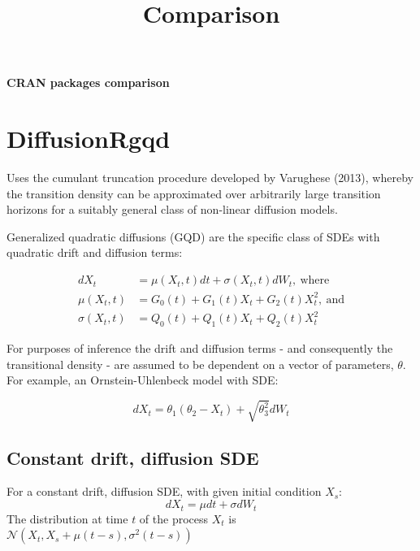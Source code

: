 \documentclass[a4paper,11pt]{article}
\begin{document}
\pagestyle{empty}
\title{Comparison}
\begin{center}
\Large\textbf{CRAN packages comparison} \\[11pt]
\normalsize
\end{center}

\section{DiffusionRgqd}
Uses the cumulant truncation procedure developed by Varughese (2013), whereby the transition density can be approximated over arbitrarily large transition horizons for a suitably general class of non-linear diffusion models.

Generalized quadratic diffusions (GQD) are the specific class of SDEs with quadratic drift and diffusion terms:

\begin{align*}
d X_t & = \mu(X_t, t)dt + \sigma(X_t, t)dW_t, \: \text{where} \\
\mu(X_t, t) & = G_0(t) + G_1(t) X_t + G_2(t) X_t^2, \: \text{and} \\
\sigma (X_t, t) & = Q_0(t) + Q_1(t) X_t + Q_2(t) X_t^2
\end{align*}

For purposes of inference the drift and diffusion terms - and consequently the transitional density - are assumed to be dependent on a vector of parameters, $\theta$. For example, an Ornstein-Uhlenbeck model with SDE:

\begin{equation}
d X_t = \theta_1 (\theta_2 - X_t) + \sqrt{\theta_3^2} dW_t
\end{equation}

\begin{knitrout}
\color{fgcolor}\begin{kframe}
\begin{alltt}
\hlkwb{=}\hlstd{(}\hlstd{)\{theta[}\hlstd{]}\hlopt{*}\hlstd{theta[}\hlstd{]\}}
\hlkwb{=}\hlstd{(}\hlstd{)\{}\hlopt{-}\hlstd{theta[}\hlstd{]\}}
\hlkwb{=}\hlstd{(}\hlstd{)\{theta[}\hlstd{]}\hlopt{*}\hlstd{theta[}\hlstd{]\}}
\end{alltt}
\end{kframe}
\end{knitrout}

\subsection{Constant drift, diffusion SDE}
For a constant drift, diffusion SDE, with given initial condition $X_s$:
\begin{equation}
dX_t = \mu dt + \sigma dW_t
\end{equation}
The distribution at time $t$ of the process $X_t$ is $\mathcal{N}(X_t, X_s + \mu(t-s), \sigma^2(t-s))$
\end{document}
